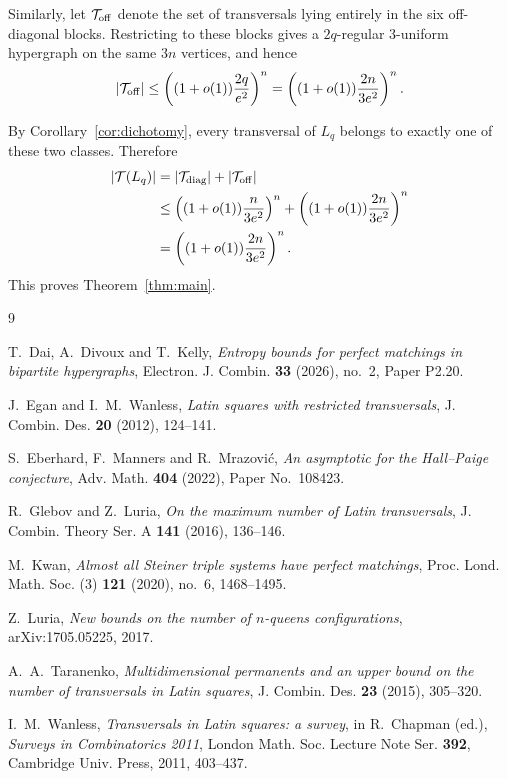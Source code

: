 \documentclass[11pt]{article}
\theoremstyle{remark}
\newcommand{\1}{\mathbf 1}
\newcommand{\T}{\mathcal T}
\begin{document}
Similarly, let $\T_{\rm off}$ denote the set of transversals lying entirely in the six off-diagonal blocks. Restricting to these blocks gives a $2q$-regular $3$-uniform hypergraph on the same $3n$ vertices, and hence
\[
|\T_{\rm off}|
\leq
\left((1+o(1))\frac{2q}{e^2}\right)^n
=
\left((1+o(1))\frac{2n}{3e^2}\right)^n.
\]

By Corollary~\ref{cor:dichotomy}, every transversal of $L_q$ belongs to exactly one of these two classes. Therefore
\[
\begin{aligned}
|\T(L_q)|
&=
|\T_{\rm diag}|+|\T_{\rm off}|\\
&\leq
\left((1+o(1))\frac{n}{3e^2}\right)^n
+
\left((1+o(1))\frac{2n}{3e^2}\right)^n\\
&=
\left((1+o(1))\frac{2n}{3e^2}\right)^n.
\end{aligned}
\]
This proves Theorem~\ref{thm:main}.

\begin{thebibliography}{9}

T.~Dai, A.~Divoux and T.~Kelly,
\emph{Entropy bounds for perfect matchings in bipartite hypergraphs},
Electron. J. Combin. \textbf{33} (2026), no.~2, Paper P2.20.

J.~Egan and I.~M.~Wanless,
\emph{Latin squares with restricted transversals},
J. Combin. Des. \textbf{20} (2012), 124--141.

S.~Eberhard, F.~Manners and R.~Mrazovi\'c,
\emph{An asymptotic for the Hall--Paige conjecture},
Adv. Math. \textbf{404} (2022), Paper No.~108423.

R.~Glebov and Z.~Luria,
\emph{On the maximum number of Latin transversals},
J. Combin. Theory Ser. A \textbf{141} (2016), 136--146.

M.~Kwan,
\emph{Almost all Steiner triple systems have perfect matchings},
Proc. Lond. Math. Soc. (3) \textbf{121} (2020), no.~6, 1468--1495.

Z.~Luria,
\emph{New bounds on the number of $n$-queens configurations},
arXiv:1705.05225, 2017.

A.~A.~Taranenko,
\emph{Multidimensional permanents and an upper bound on the number of transversals in Latin squares},
J. Combin. Des. \textbf{23} (2015), 305--320.

I.~M.~Wanless,
\emph{Transversals in Latin squares: a survey},
in R.~Chapman (ed.), \emph{Surveys in Combinatorics 2011},
London Math. Soc. Lecture Note Ser. \textbf{392},
Cambridge Univ. Press, 2011, 403--437.

\end{thebibliography}
\end{document}
